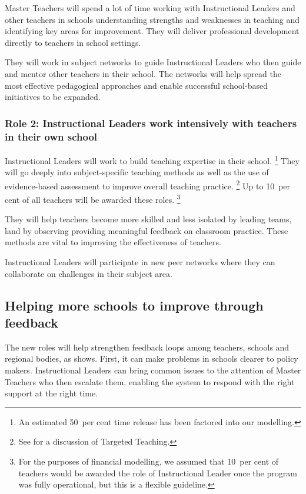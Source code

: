 \documentclass{grattan}
\begin{document}
Master Teachers will spend a lot of time working with Instructional Leaders and other teachers in schools understanding strengths and weaknesses in teaching and identifying key areas for improvement.
They will deliver professional development directly to teachers in school settings.

They will work in subject networks to guide Instructional Leaders who then guide and mentor other teachers in their school.
The networks will help spread the most effective pedagogical approaches and enable successful school-based initiatives to be expanded.

\subsubsection{Role 2: Instructional Leaders work intensively with teachers in their own school}\label{subsubsec:role-2-instructional-leaders-work-intensively-with-teachers-in-their-school}

Instructional Leaders will work to build teaching expertise in their school.%
\footnote{An estimated 50~per cent time release has been factored into our modelling.} They will go deeply into subject-specific teaching methods as well as the use of evidence-based assessment to improve overall teaching practice.%
\footnote{See \textcite{Goss2015TargetedTeachingHow} for a discussion of Targeted Teaching.}
Up to 10~per cent of all teachers will be awarded these roles.%
\footnote{For the purposes of financial modelling, we assumed that 10~per cent of teachers would be awarded the role of Instructional Leader once the program was fully operational, but this is a flexible guideline.}

They will help teachers become more skilled and less isolated by leading teams, land by observing providing meaningful feedback on classroom practice.
These methods are vital to improving the effectiveness of teachers.

Instructional Leaders will participate in new peer networks where they can collaborate on challenges in their subject area.


\subsection{Helping more schools to improve through feedback }\label{subsec:helping-more-schools-to-improve-through-feedback}

The new roles will help strengthen feedback loops among teachers, schools and regional bodies, as  shows.
First, it can make problems in schools clearer to policy makers.
Instructional Leaders can bring common issues to the attention of Master Teachers who then escalate them, enabling the system to respond with the right support at the right time.
\end{document}
